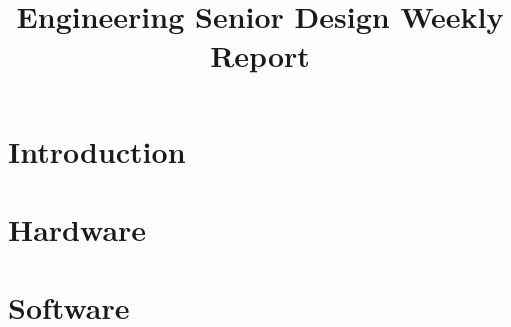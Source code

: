 \documentclass[12pt,oneside,letterpaper,english]{article}
\title{Engineering Senior Design Weekly Report} %
\begin{document}


\newpage
\doublespacing
{} %
\renewcommand{\baselinestretch}{1}\normalsize
\tableofcontents
\renewcommand{\baselinestretch}{1}\normalsize
\thispagestyle{fancy} %

% 


\newpage
{} 

\newpage
\section{Introduction} \label{ch1}
 

\newpage
\section{Hardware} \label{ch2}


\section{Software} \label{ch3}


\label{EndOfText}



\label{endOfDoc}
\end{document}

